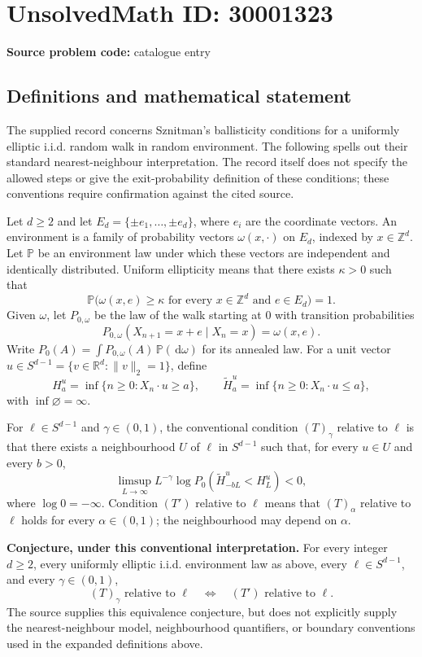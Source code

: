 \documentclass[11pt]{article}
\newcommand{\Z}{\mathbb{Z}}
\newcommand{\R}{\mathbb{R}}
\newcommand{\dd}{\,\mathrm{d}}
\begin{document}
\section*{UnsolvedMath ID: 30001323}
\textbf{Source problem code:} catalogue entry
\subsection{Definitions and mathematical statement}
The supplied record concerns Sznitman's ballisticity conditions for a uniformly elliptic i.i.d. random walk in random environment. The following spells out their standard nearest-neighbour interpretation. The record itself does not specify the allowed steps or give the exit-probability definition of these conditions; these conventions require confirmation against the cited source.

Let \(d\geq2\) and let \(E_d=\{\pm e_1,\ldots,\pm e_d\}\), where \(e_i\) are the coordinate vectors. An environment is a family of probability vectors \(\omega(x,\cdot)\) on \(E_d\), indexed by \(x\in\Z^d\). Let \(\mathbb P\) be an environment law under which these vectors are independent and identically distributed. Uniform ellipticity means that there exists \(\kappa>0\) such that
\[
\mathbb P\bigl(\omega(x,e)\geq\kappa\text{ for every }x\in\Z^d\text{ and }e\in E_d\bigr)=1.
\]
Given \(\omega\), let \(P_{0,\omega}\) be the law of the walk starting at \(0\) with transition probabilities
\[
P_{0,\omega}(X_{n+1}=x+e\mid X_n=x)=\omega(x,e).
\]
Write \(P_0(A)=\int P_{0,\omega}(A)\,\mathbb P(\dd\omega)\) for its annealed law. For a unit vector \(u\in S^{d-1}=\{v\in\R^d:\|v\|_2=1\}\), define
\[
H_a^u=\inf\{n\geq0:X_n\cdot u\geq a\},\qquad
\widetilde H_a^u=\inf\{n\geq0:X_n\cdot u\leq a\},
\]
with \(\inf\varnothing=\infty\).

For \(\ell\in S^{d-1}\) and \(\gamma\in(0,1)\), the conventional condition \((T)_\gamma\) relative to \(\ell\) is that there exists a neighbourhood \(U\) of \(\ell\) in \(S^{d-1}\) such that, for every \(u\in U\) and every \(b>0\),
\[
\limsup_{L\to\infty}L^{-\gamma}\log P_0\!\left(\widetilde H_{-bL}^{u}<H_L^{u}\right)<0,
\]
where \(\log0=-\infty\). Condition \((T')\) relative to \(\ell\) means that \((T)_\alpha\) relative to \(\ell\) holds for every \(\alpha\in(0,1)\); the neighbourhood may depend on \(\alpha\).

\textbf{Conjecture, under this conventional interpretation.} For every integer \(d\geq2\), every uniformly elliptic i.i.d. environment law as above, every \(\ell\in S^{d-1}\), and every \(\gamma\in(0,1)\),
\[
(T)_\gamma\text{ relative to }\ell
\quad\Longleftrightarrow\quad
(T')\text{ relative to }\ell.
\]
The source supplies this equivalence conjecture, but does not explicitly supply the nearest-neighbour model, neighbourhood quantifiers, or boundary conventions used in the expanded definitions above.
\end{document}
